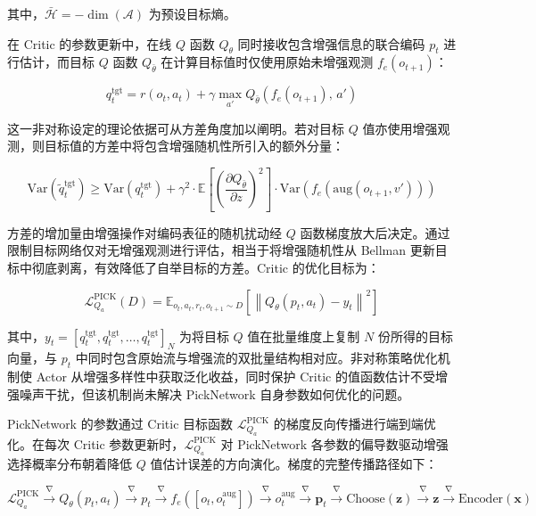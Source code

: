 其中，$\bar{\mathcal{H}} = -\dim(\mathcal{A})$ 为预设目标熵。

在 Critic 的参数更新中，在线 $Q$ 函数 $Q_\theta$ 同时接收包含增强信息的联合编码 $p_t$ 进行估计，而目标 $Q$ 函数 $Q_{\bar{\theta}}$ 在计算目标值时仅使用原始未增强观测 $f_e(o_{t+1})$：

\begin{equation}
    q_t^{\text{tgt}} = r(o_t, a_t) + \gamma \max_{a'} Q_{\bar{\theta}}\!\left( f_e(o_{t+1}),\, a' \right)
    \label{eq:q_target}
\end{equation}

这一非对称设定的理论依据可从方差角度加以阐明。若对目标 $Q$ 值亦使用增强观测，则目标值的方差中将包含增强随机性所引入的额外分量：

\begin{equation}
    \mathrm{Var}(\tilde{q}_t^{\text{tgt}}) \geq \mathrm{Var}(q_t^{\text{tgt}}) + \gamma^2 \cdot \mathbb{E}\!\left[\left(\frac{\partial Q_{\bar{\theta}}}{\partial z}\right)^{\!2}\right] \cdot \mathrm{Var}\!\left(f_e(\text{aug}(o_{t+1}, v'))\right)
\end{equation}

方差的增加量由增强操作对编码表征的随机扰动经 $Q$ 函数梯度放大后决定。通过限制目标网络仅对无增强观测进行评估，相当于将增强随机性从 Bellman 更新目标中彻底剥离，有效降低了自举目标的方差。Critic 的优化目标为：

\begin{equation}
    \mathcal{L}_{Q_a}^{\text{PICK}}(D) = \mathbb{E}_{o_t, a_t, r_t, o_{t+1} \sim D}\!\left[ \left\| Q_\theta(p_t, a_t) - y_t \right\|^2 \right]
    \label{eq:critic_loss}
\end{equation}

其中，$y_t = [q_t^{\text{tgt}}, q_t^{\text{tgt}}, \ldots, q_t^{\text{tgt}}]_N$ 为将目标 $Q$ 值在批量维度上复制 $N$ 份所得的目标向量，与 $p_t$ 中同时包含原始流与增强流的双批量结构相对应。非对称策略优化机制使 Actor 从增强多样性中获取泛化收益，同时保护 Critic 的值函数估计不受增强噪声干扰，但该机制尚未解决 PickNetwork 自身参数如何优化的问题。

PickNetwork 的参数通过 Critic 目标函数 $\mathcal{L}_{Q_a}^{\text{PICK}}$ 的梯度反向传播进行端到端优化。在每次 Critic 参数更新时，$\mathcal{L}_{Q_a}^{\text{PICK}}$ 对 PickNetwork 各参数的偏导数驱动增强选择概率分布朝着降低 $Q$ 值估计误差的方向演化。梯度的完整传播路径如下：

\begin{equation}
    \mathcal{L}_{Q_a}^{\text{PICK}} \xrightarrow{\nabla} Q_\theta(p_t, a_t) \xrightarrow{\nabla} p_t \xrightarrow{\nabla} f_e([o_t, o_t^{\text{aug}}]) \xrightarrow{\nabla} o_t^{\text{aug}} \xrightarrow{\nabla} \mathbf{p}_t \xrightarrow{\nabla} \text{Choose}(\mathbf{z}) \xrightarrow{\nabla} \mathbf{z} \xrightarrow{\nabla} \text{Encoder}(\mathbf{x})
\end{equation}

